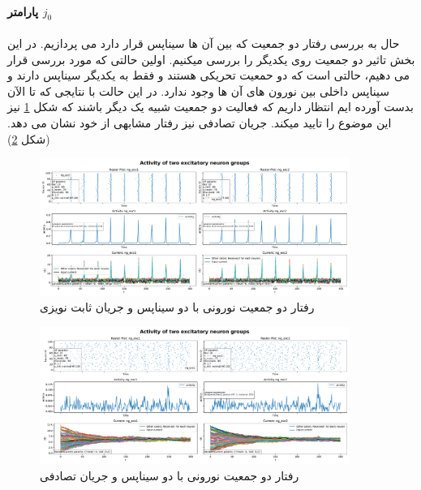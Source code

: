             \paragraph*{پارامتر $j_0$}
            حال به بررسی رفتار دو جمعیت که بین آن ها سیناپس قرار دارد می پردازیم. در این بخش   تاثیر دو جمعیت روی یکدیگر را بررسی میکنیم. اولین حالتی که مورد بررسی قرار می دهیم، حالتی است که دو حمعیت تحریکی هستند و فقط به یکدیگر سیناپس دارند و سیناپس داخلی بین نورون های آن ها وجود ندارد.
            در این حالت با نتایجی که تا الآن بدست آورده ایم انتظار داریم که فعالیت دو جمعیت شبیه یک دیگر باشند که شکل
            \ref{fig:part2-two-ng-full-synapse-noise-curr}
            نیز این موضوع را تایید میکند. جریان تصادفی نیز رفتار مشابهی از خود نشان می دهد. 
            (شکل \ref{fig:part2-two-ng-full-synapse-rand-curr})
            \begin{figure}[!ht]
                \centering
                \includegraphics[width=0.9\textwidth]{plots/part2-two-ng-full-synapse-noise-curr.pdf} 
                \caption{رفتار دو جمعیت نورونی با دو سیناپس و جریان ثابت نویزی}
                \label{fig:part2-two-ng-full-synapse-noise-curr}
            \end{figure}
            \begin{figure}[!ht]
                \centering
                \includegraphics[width=0.9\textwidth]{plots/part2-two-ng-full-synapse-rand-curr.pdf} 
                \caption{رفتار دو جمعیت نورونی با دو سیناپس و جریان تصادفی}
                \label{fig:part2-two-ng-full-synapse-rand-curr}
            \end{figure}

